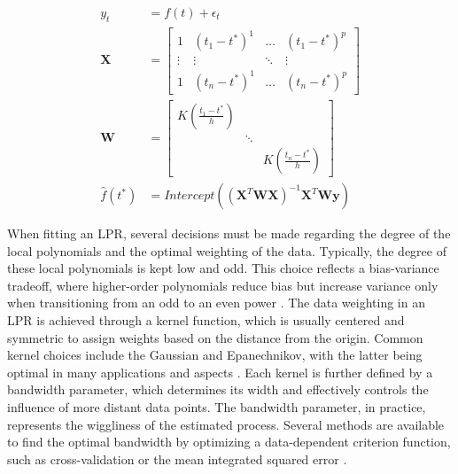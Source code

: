 \documentclass[man, floatsintext]{apa7}
\begin{document}
\begin{equation} \label{eq:lpr_equations}
  \begin{aligned}
    y_t          & = f(t) + \epsilon_t                            \\
    \textbf{X}   & =
    \begin{bmatrix}
      1      & (t_1 - t^*)^1 & \dots  & (t_1 - t^*)^p \\
      \vdots & \vdots        & \ddots & \vdots        \\
      1      & (t_n - t^*)^1 & \dots  & (t_n - t^*)^p
    \end{bmatrix} \\
    \textbf{W}   & =
    \begin{bmatrix}
      K(\frac{t_1 - t^*}{h}) &        &                        \\
                             & \ddots &                        \\
                             &        & K(\frac{t_n - t^*}{h})
    \end{bmatrix}                          \\
    \hat{f}(t^*) & =
    Intercept((\textbf{X}^T\textbf{WX})^{-1}\textbf{X}^T\textbf{Wy})
  \end{aligned}
\end{equation}

When fitting an LPR, several decisions must be
made regarding the degree of the local polynomials and the optimal weighting of
the data. Typically, the degree of these local polynomials is kept low and odd.
This choice reflects a bias-variance tradeoff, where higher-order polynomials
reduce bias but increase variance only when transitioning from an odd
to an even power \parencite{ruppert_multivariate_1994}. The data weighting
in an LPR is achieved through a
kernel function, which is usually centered and symmetric to assign weights
based
on the distance from the origin. Common kernel choices include the Gaussian and
Epanechnikov, with the latter being optimal in many applications and
aspects \parencite{fan_local_1997}. Each kernel is further defined by a
bandwidth parameter, which determines its width and effectively controls the
influence of more distant data points. The bandwidth parameter, in practice,
represents the wiggliness of the estimated process.
Several methods are available to find the optimal bandwidth by optimizing a
data-dependent criterion function, such as cross-validation or the mean
integrated squared error \parencite{kohler_review_2014, debruyne_model_2008}.
\end{document}
